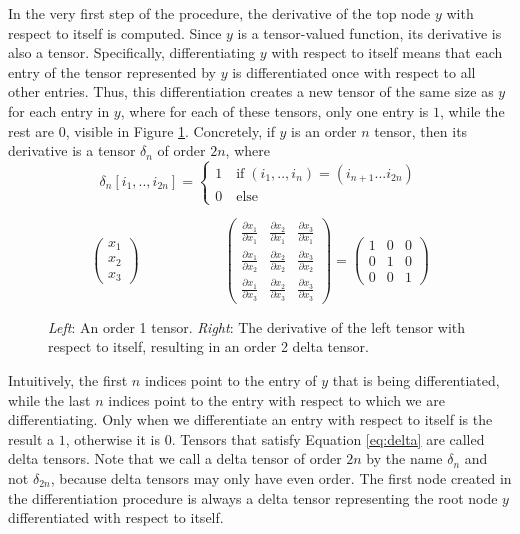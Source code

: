 \documentclass[12pt, a4paper]{report}
\begin{document}
In the very first step of the procedure, the derivative of the top node $y$ with respect to itself is computed.
Since $y$ is a tensor-valued function, its derivative is also a tensor.
Specifically, differentiating $y$ with respect to itself means that each entry of the tensor represented by $y$ is differentiated once with respect to all other entries.
Thus, this differentiation creates a new tensor of the same size as $y$ for each entry in $y$, where for each of these tensors, only one entry is $1$, while the rest are $0$, visible in Figure \ref{fig:delta}.
Concretely, if $y$ is an order $n$ tensor, then its derivative is a tensor $\delta_n$ of order $2n$, where
\begin{equation}
    \delta_n[i_1,..,i_{2n}] = 
    \begin{cases}
        1 \quad \text{if} \; (i_1,..,i_n) = (i_{n+1}...i_{2n}) \\
        0 \quad \text{else}
    \end{cases}
    \label{eq:delta}
\end{equation}
\begin{figure}
    $$
    \begin{pmatrix}
        x_1\\
        x_2\\
        x_3
    \end{pmatrix} \quad \quad \quad \quad \quad \quad
    \begin{pmatrix}
        \frac{\partial x_1}{\partial x_1} & \frac{\partial x_2}{\partial x_1} & \frac{\partial x_3}{\partial x_1} \\
        \frac{\partial x_1}{\partial x_2} & \frac{\partial x_2}{\partial x_2} & \frac{\partial x_3}{\partial x_2} \\
        \frac{\partial x_1}{\partial x_3} & \frac{\partial x_2}{\partial x_3} & \frac{\partial x_3}{\partial x_3}
    \end{pmatrix}
    =
    \begin{pmatrix}
        1 & 0 & 0 \\
        0 & 1 & 0 \\
        0 & 0 & 1
    \end{pmatrix}
    $$
    \caption{\textit{Left}: An order 1 tensor. \textit{Right}: The derivative of the left tensor with respect to itself, resulting in an order 2 delta tensor.}
    \label{fig:delta}
\end{figure}
Intuitively, the first $n$ indices point to the entry of $y$ that is being differentiated, while the last $n$ indices point to the entry with respect to which we are differentiating.
Only when we differentiate an entry with respect to itself is the result a $1$, otherwise it is $0$.
Tensors that satisfy Equation \ref{eq:delta} are called delta tensors.
Note that we call a delta tensor of order $2n$ by the name $\delta_n$ and not $\delta_{2n}$, because delta tensors may only have even order.
The first node created in the differentiation procedure is always a delta tensor representing the root node $y$ differentiated with respect to itself.
\end{document}
